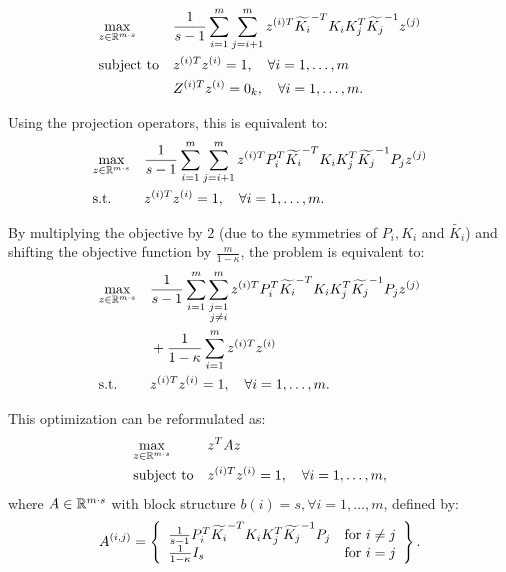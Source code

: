  \begin{equation}\label{eq:Zkdimapproxdualqcqp}
\begin{aligned}
& \underset{z \in \mathbb{R}^{m\cdot s}}{\text{max}}
& & \frac{1}{s -1} \sum_{i = 1}^m \sum_{j = i+1}^m z^{(i)T} \widetilde{K_i}^{-T} K_i K_j^T \widetilde{K_j}^{-1} z^{(j)} \\
& \text{subject to}
& & z^{(i)T}  z^{(i)} = 1, \quad\forall i = 1,\ldots, m\\
& & & Z^{(i)T} z^{(i)} = 0_k, \quad\forall i = 1,\ldots, m.
\end{aligned}
\end{equation}

Using the projection operators, this is equivalent to:
\begin{equation*}
\begin{aligned}
& \underset{z \in \mathbb{R}^{m\cdot s}}{\text{max}}
& & \frac{1}{s -1} \sum_{i = 1}^m \sum_{j = i+1}^m z^{(i)T} P_i^T \widetilde{K_i}^{-T} K_i K_j^T \widetilde{K_j}^{-1} P_j z^{(j)}\\
& \text{s.t.}
& & z^{(i)T}  z^{(i)} = 1, \quad\forall i = 1,\ldots, m.
\end{aligned}
\end{equation*}

By multiplying the objective by $2$ (due to the symmetries of $P_i, K_i$ and $\widetilde{K_i}$) 
and shifting the objective function by $\frac{m}{1 - \kappa}$, the problem is equivalent to:
\begin{equation}
\begin{aligned}
& \underset{z \in \mathbb{R}^{m\cdot s}}{\text{max}}
& & \frac{1}{s -1} \sum_{i = 1}^m \sum_{\substack{j = 1\\ j\neq i}}^m z^{(i)T} P_i^T \widetilde{K_i}^{-T} K_i K_j^T \widetilde{K_j}^{-1} P_j z^{(j)}\\
&&& + \frac{1}{1-\kappa}\sum_{i = 1}^m z^{(i)T}  z^{(i)}\\
& \text{s.t.}
& & z^{(i)T}  z^{(i)} = 1, \quad\forall i = 1,\ldots, m.
\end{aligned}
\end{equation}

This optimization can be reformulated as:
\begin{equation}\label{eq:projZkdimapproxdualqcqp}
\begin{aligned}
& \underset{z \in \mathbb{R}^{m\cdot s}}{\text{max}}
& & z^T A z\\
& \text{subject to}
& & z^{(i)T}  z^{(i)} = 1, \quad\forall i = 1,\ldots, m,
\end{aligned}
\end{equation}
where $A \in \mathbb{R}^{m\cdot s}$ with block structure $b\left(i\right) = s, \forall i = 1,\ldots, m$, defined by:
\begin{equation*}
 A^{(i,j)} = \left\{ \begin{array}{lll}
 \frac{1}{s -1} P_i^T \widetilde{K_i}^{-T} K_i K_j^T \widetilde{K_j}^{-1} P_j  & {\rm for} ~i \neq j\\
\frac{1}{1-\kappa } I_s & {\rm for} ~i = j \end{array}\right\}.
\end{equation*}


